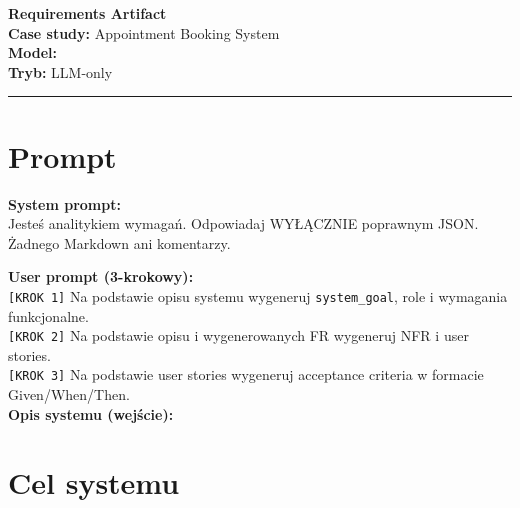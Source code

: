 \documentclass[12pt,a4paper]{article}
\begin{document}
\begin{center}
  {\LARGE\bfseries Requirements Artifact}\\[1.5em]
  {\large \textbf{Case study:} Appointment Booking System}\\[0.3em]
  {\large \textbf{Model:}  \quad }\\[0.3em]
  {\large \textbf{Tryb:} LLM-only \quad }\\[0.3em]

\end{center}

\vspace{1em}\hrule\vspace{1.5em}

\section{Prompt}

\begin{mdframed}[backgroundcolor=metabg, linewidth=0pt, innerleftmargin=10pt, innerrightmargin=10pt, innertopmargin=8pt, innerbottommargin=8pt]
\textbf{System prompt:}\\
\small Jesteś analitykiem wymagań. Odpowiadaj WYŁĄCZNIE poprawnym JSON. Żadnego Markdown ani komentarzy.
\end{mdframed}

\vspace{0.5em}
\begin{mdframed}[backgroundcolor=promptbg, linewidth=0pt, innerleftmargin=10pt, innerrightmargin=10pt, innertopmargin=8pt, innerbottommargin=8pt]
\textbf{User prompt (3-krokowy):}\\[0.3em]
\small
\texttt{[KROK 1]} Na podstawie opisu systemu wygeneruj \texttt{system\_goal}, role i wymagania funkcjonalne.\\
\texttt{[KROK 2]} Na podstawie opisu i wygenerowanych FR wygeneruj NFR i user stories.\\
\texttt{[KROK 3]} Na podstawie user stories wygeneruj acceptance criteria w formacie Given/When/Then.\\[0.3em]
\textbf{Opis systemu (wejście):}\\

\end{mdframed}


\section{Cel systemu}
\end{document}
